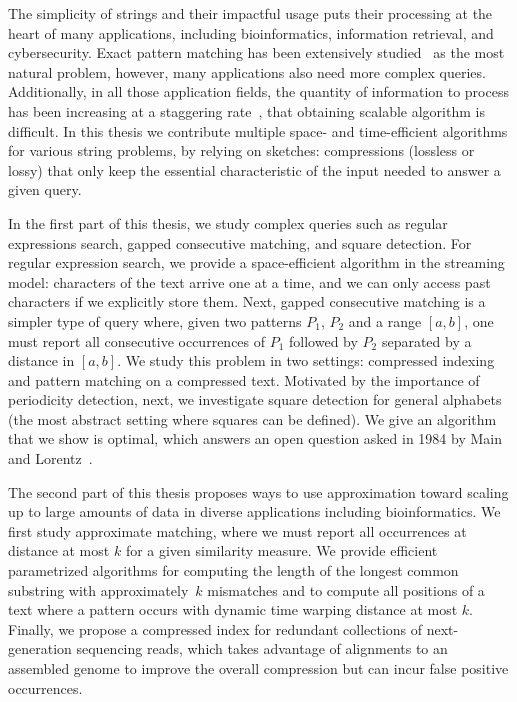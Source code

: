 The simplicity of strings and their impactful usage puts their processing at the heart of many applications, including bioinformatics, information retrieval, and cybersecurity. Exact pattern matching has been extensively studied~\cite{Charras2004} as the most natural problem, however, many applications also need more complex queries. Additionally, in all those application fields, the quantity of information to process has been increasing at a staggering rate~\cite{muir2016real}, that obtaining scalable algorithm is difficult.
In this thesis we contribute multiple space- and time-efficient algorithms for various string problems, by relying on sketches: compressions (lossless or lossy) that only keep the essential characteristic of the input needed to answer a given query.%

In the first part of this thesis, we study complex queries such as regular expressions search, gapped consecutive matching, and square detection. 
For regular expression search, we provide a space-efficient algorithm in the streaming model: characters of the text arrive one at a time, and we can only access past characters if we explicitly store them. 
Next, gapped consecutive matching is a simpler type of query where, given two patterns $P_1$, $P_2$ and a range $[a,b]$, one must report all consecutive occurrences of $P_1$ followed by $P_2$ separated by a distance in $[a,b]$. We study this problem in two settings: compressed indexing and pattern matching on a compressed text.
Motivated by the importance of periodicity detection, next, we investigate square detection for general alphabets (the most abstract setting where squares can be defined). We give an algorithm that we show is optimal, which answers an open question asked in 1984 by Main and Lorentz~\cite{Main1984}.



The second part of this thesis proposes ways to use approximation toward scaling up to large amounts of data in diverse applications including bioinformatics.
We first study approximate matching, where we must report all occurrences at distance at most $k$ for a given similarity measure. %
We provide efficient parametrized algorithms for computing the length of the longest common substring with approximately~$k$ mismatches and to compute all positions of a text where a pattern occurs with dynamic time warping distance at most $k$.
Finally, we propose a compressed index for redundant collections of next-generation sequencing reads, which takes advantage of alignments to an assembled genome to improve the overall compression but can incur false positive occurrences.

